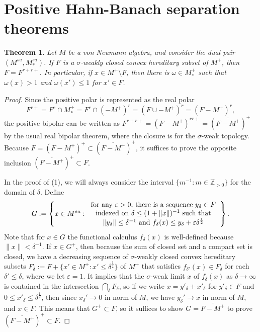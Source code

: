 \documentclass[noamsfonts,a4paper,10pt]{amsart}
\theoremstyle{plain}
\newtheorem{thm}{Theorem}[section]
\theoremstyle{definition}
\theoremstyle{remark}
\begin{document}
\section{Positive Hahn-Banach separation theorems}



\begin{thm}\label{2.1}
Let $M$ be a von Neumann algebra, and consider the dual pair $(M^{sa},M_*^{sa})$.
If $F$ is a $\sigma$-weakly closed convex hereditary subset of $M^+$, then $F=F^{r+r+}$.
In particular, if $x\in M^+\setminus F$, then there is $\omega\in M_*^+$ such that $\omega(x)>1$ and $\omega(x')\le1$ for $x'\in F$.
\end{thm}
\begin{proof}
Since the positive polar is represented as the real polar
\[F^{r+}=F^r\cap M_*^+=F^r\cap(-M^+)^r=(F\cup-M^+)^r=(F-M^+)^r,\]
the positive bipolar can be written as $F^{r+r+}=(F-M^+)^{rr+}=(\overline{F-M^+})^+$ by the usual real bipolar theorem, where the closure is for the $\sigma$-weak topology.
Because $F=(F-M^+)^+\subset(\overline{F-M^+})^+$, it suffices to prove the opposite inclusion $(\overline{F-M^+})^+\subset F$.

In the proof of (1), we will always consider the interval $\{m^{-1}:m\in\mathbb{Z}_{>0}\}$ for the domain of $\delta$.
Define
\[G:=\left\{x\in M^{sa}:\begin{tabular}{c}
for any $\varepsilon>0$, there is a sequence $y_\delta\in F$\\
indexed on $\delta\le(1+\|x\|)^{-1}$ such that\\
$\|y_\delta\|\le\delta^{-1}$ and $f_\delta(x)\le y_\delta+\varepsilon\delta^{\frac12}$
\end{tabular}\right\}.\]
Note that for $x\in G$ the functional calculus $f_\delta(x)$ is well-defined because $\|x\|<\delta^{-1}$.
If $x\in G^+$, then because the sum of closed set and a compact set is closed, we have a decreasing sequence of $\sigma$-weakly closed convex hereditary subsets $F_\delta:=F+\{x'\in M^+:x'\le\delta^{\frac12}\}$ of $M^+$ that satisfies $f_{\delta'}(x)\in F_\delta$ for each $\delta'\le\delta$, where we let $\varepsilon=1$.
It implies that the $\sigma$-weak limit $x$ of $f_\delta(x)$ as $\delta\to\infty$ is contained in the intersection $\bigcap_\delta F_\delta$, so if we write $x=y'_\delta+x'_\delta$ for $y'_\delta\in F$ and $0\le x'_\delta\le\delta^{\frac12}$, then since $x_\delta'\to0$ in norm of $M$, we have $y_\delta'\to x$ in norm of $M$, and $x\in F$.
This means that $G^+\subset F$, so it suffices to show $G=\overline{F-M^+}$ to prove $(\overline{F-M^+})^+\subset F$.


\end{proof}
\end{document}
